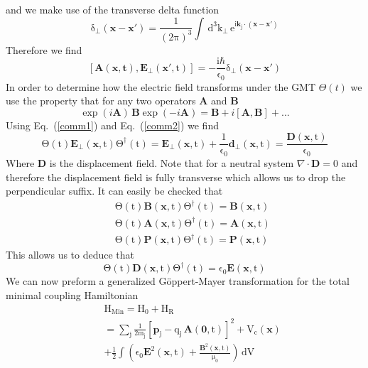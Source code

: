 and we make use of the transverse delta function
\begin{equation}
\mathrm{\delta_{\perp}(\mathbf{x}-\mathbf{x}')=\frac{1}{(2\pi)^3}\int\,d^3k_{\perp}\,e^{i\mathbf{k}_j\cdot(\mathbf{x}-\mathbf{x}')}}
\end{equation}
Therefore we find 
\begin{equation}
\mathrm{[\mathbf{A}(\mathbf{x,t}),\mathbf{E}_{\perp}(\mathbf{x}',t)]=-\frac{i\hbar}{\epsilon_0}\delta_{\perp}(\mathbf{x}-\mathbf{x}')}
\label{comm1}
\end{equation}
In order to determine how the electric field transforms under the GMT $\Theta(t)$ we use the property that for any two operators $\mathbf{A}$ and $\mathbf{B}$
\begin{equation}
\exp{(i\mathbf{A})}\,\mathbf{B}\exp{(-i\mathbf{A})}=\mathbf{B}+i[\mathbf{A},\mathbf{B}]+...
\label{comm2}
\end{equation}
Using Eq.\ (\ref{comm1}) and Eq.\ (\ref{comm2}) we find
\begin{equation}
\mathrm{\Theta(t)\mathbf{E}_{\perp}(\mathbf{x},t)\Theta^{\dagger}(t)=\mathbf{E}_{\perp}(\mathbf{x},t)+\frac{1}{\epsilon_0}\mathbf{d}_{\perp}(\mathbf{x},t)=\frac{\mathbf{D}(\mathbf{x},t)}{\epsilon_0}}
\end{equation}
Where $\mathbf{D}$ is the displacement field.  Note that for a neutral system $\nabla\cdot\mathbf{D}=0$ and therefore the displacement field is fully transverse which allows us to drop the perpendicular suffix.
It can easily be checked that 
\begin{eqnarray}
&&\mathrm{\Theta(t)\mathbf{B}(\mathbf{x},t)\Theta^{\dagger}(t)=\mathbf{B}(\mathbf{x},t)} \\
&&\mathrm{\Theta(t)\mathbf{A}(\mathbf{x},t)\Theta^{\dagger}(t)=\mathbf{A}(\mathbf{x},t)} \\
&&\mathrm{\Theta(t)\mathbf{P}(\mathbf{x},t)\Theta^{\dagger}(t)=\mathbf{P}(\mathbf{x},t)}
\end{eqnarray}
This allows us to deduce that 
\begin{equation}
\mathrm{\Theta(t)\mathbf{D}(\mathbf{x},t)\Theta^{\dagger}(t)=\epsilon_0\mathbf{E}(\mathbf{x},t)} 
\end{equation}
We can now preform a generalized G\"{o}ppert-Mayer transformation for the total minimal coupling Hamiltonian
\begin{eqnarray}
&&\mathrm{H_{Min}=H_0+H_R}\nonumber \\
&&=\mathrm{\sum_{j}\frac{1}{2m_j}\left[\mathbf{p}_j-q_j \,\mathbf{A}(\mathbf{0},t)\right]^2+V_{c}(\mathbf{x})}\nonumber \\
&&\mathrm{+\frac{1}{2}\int\left( \epsilon_0\mathbf{E}^2(\mathbf{x},t)+\frac{\mathbf{B}^2(\mathbf{x},t)}{\mu_0}\right)\,dV}
\label{fullminimal}
\end{eqnarray}
